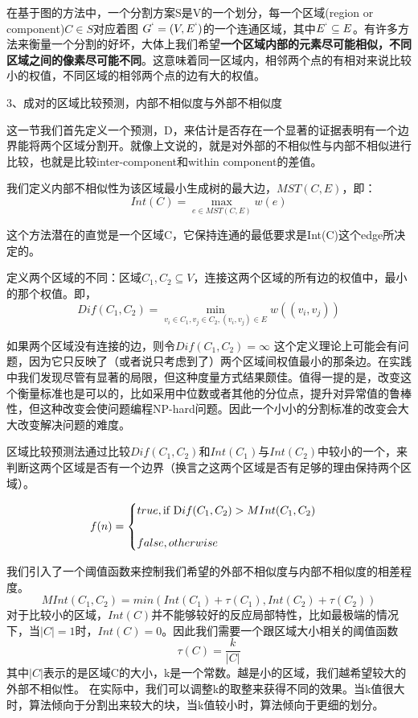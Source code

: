 在基于图的方法中，一个分割方案S是V的一个划分，每一个区域(region or component)\(C \in S\)对应着图
\(G^` = (V,E^`)\)的一个连通区域，其中\(E^` \subseteq E\)。有许多方法来衡量一个分割的好坏，大体上我们希望\textbf{一个区域内部的元素尽可能相似，不同区域之间的像素尽可能不同}。这意味着同一区域内，相邻两个点的有相对来说比较小的权值，不同区域的相邻两个点的边有大的权值。

3、成对的区域比较预测，内部不相似度与外部不相似度

这一节我们首先定义一个预测，D，来估计是否存在一个显著的证据表明有一个边界能将两个区域分割开。就像上文说的，就是对外部的不相似性与内部不相似进行比较，也就是比较inter-component和within component的差值。

我们定义内部不相似性为该区域最小生成树的最大边，\(MST(C,E)\)，即：
\begin{equation}
Int(C) = \mathop {\max }\limits_{e \in MST(C,E)}w(e)
\end{equation}

这个方法潜在的直觉是一个区域C，它保持连通的最低要求是Int(C)这个edge所决定的。

定义两个区域的不同：区域\(C_1,C_2 \subseteq V\)，连接这两个区域的所有边的权值中，最小的那个权值。即，
\begin{equation}
Dif(C_1,C_2) = \mathop {\min }\limits_{v_i \in C_1 ,v_j \in C_2, (v_i,v_j) \in E}w((v_i,v_j))
\end{equation}

如果两个区域没有连接的边，则令\(Dif(C_1,C_2) = \infty\)
这个定义理论上可能会有问题，因为它只反映了（或者说只考虑到了）两个区域间权值最小的那条边。在实践中我们发现尽管有显著的局限，但这种度量方式结果颇佳。值得一提的是，改变这个衡量标准也是可以的，比如采用中位数或者其他的分位点，提升对异常值的鲁棒性，但这种改变会使问题编程NP-hard问题。因此一个小小的分割标准的改变会大大改变解决问题的难度。

区域比较预测法通过比较\(Dif(C_1,C_2)\)和\(Int(C_1)\)与\(Int(C_2)\)中较小的一个，来判断这两个区域是否有一个边界（换言之这两个区域是否有足够的理由保持两个区域）。

\begin{equation}
f(n) =\begin{cases} 
true,   \mbox {if } \mbox Dif(C_1,C_2) > M Int(C_1,C_2)\\\\
false,  otherwise \end{cases}
\end{equation}

我们引入了一个阈值函数来控制我们希望的外部不相似度与内部不相似度的相差程度。
\begin{equation}
MInt(C_1,C_2) = min(Int(C_1) + \tau(C_1),Int(C_2) + \tau(C_2))
\end{equation}
对于比较小的区域，\(Int(C)\)并不能够较好的反应局部特性，比如最极端的情况下，当\(|C| = 1\)时，\(Int(C) = 0\)。因此我们需要一个跟区域大小相关的阈值函数
\[\tau (C) = \frac{k}{|C|}\]
其中\(|C|\)表示的是区域C的大小，k是一个常数。越是小的区域，我们越希望较大的外部不相似性。
在实际中，我们可以调整k的取整来获得不同的效果。当k值很大时，算法倾向于分割出来较大的块，当k值较小时，算法倾向于更细的划分。

